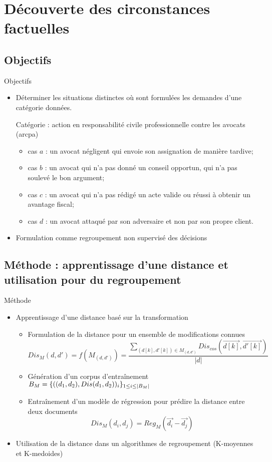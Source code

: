\section{Découverte des circonstances factuelles}
\subsection{Objectifs}
\begin{frame}[c]{Objectifs}
	
	\begin{itemize} \small
		\item Déterminer les situations distinctes où sont formulées les demandes d'une catégorie données.
		\begin{exampleblock}{Catégorie : action en responsabilité civile professionnelle contre les avocats (arcpa)}\small
			\begin{itemize}
				\item cas $a$ : un avocat négligent qui envoie son assignation de manière tardive; 
				\item cas $b$ : un avocat qui n'a pas donné un conseil opportun, qui n'a pas soulevé le bon argument;
				\item cas $c$ : un avocat qui n'a pas rédigé un acte valide ou réussi à obtenir un avantage fiscal; 
				\item cas $d$ : un avocat attaqué par son adversaire et non par son propre client.
			\end{itemize}
		\end{exampleblock}
		\item Formulation comme regroupement non supervisé des décisions
	\end{itemize}
\end{frame}
\subsection{Méthode : apprentissage d'une distance et utilisation pour du regroupement}
\begin{frame}[c]{Méthode}
	\begin{itemize}
		\item Apprentissage d'une distance basé sur la transformation
	\begin{itemize} 
		\item Formulation de la distance pour un ensemble de modifications connues	
		\[{Dis_{M}}(d,d') = {f}({M}_{(d,d')}) = \frac{\sum\limits_{(d[k], d'[k]) \in {M}_{(d,d')}} Dis_{cos}(\overrightarrow{d[k]}, \overrightarrow{d'[k]})}{\vert d \vert}\] 
		\item Génération d'un corpus d'entraînement	$B_{M} = \lbrace ((d_1, d_2), {Dis}(d_1, d_2))_i\rbrace_{1 \leq i \leq {\vert B_{M}\vert}}$
		\item Entraînement d'un modèle de régression pour prédire la distance entre deux documents \[Dis_{M}(d_i, d_j) = Reg_{M}(\vec{d_{i}} - \vec{d_{j}})\]
	\end{itemize}
	\item Utilisation de la distance dans un algorithmes de regroupement (K-moyennes et K-medoides)
	\end{itemize}	
\end{frame}


